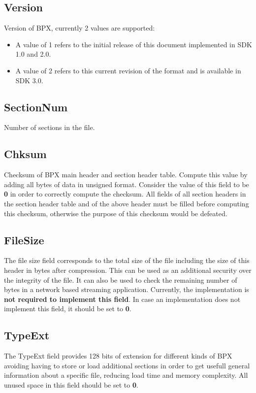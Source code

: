 \subsection{Version}
Version of BPX, currently 2 values are supported:
\begin{itemize}
	\item A value of 1 refers to the initial release of this document implemented in SDK 1.0 and 2.0.
	\item A value of 2 refers to this current revision of the format and is available in SDK 3.0.
\end{itemize}

\subsection{SectionNum}
Number of sections in the file.

\subsection{Chksum}
Checksum of BPX main header and section header table. Compute this value by adding all bytes of data in unsigned format. Consider the value of this field to be \textbf{0} in order to correctly compute the checksum.\newline
All fields of all section headers in the section header table and of the above header must be filled before computing this checksum, otherwise the purpose of this checksum would be defeated.

\subsection{FileSize}
The file size field corresponds to the total size of the file including the size of this header in bytes after compression.\newline
This can be used as an additional security over the integrity of the file. It can also be used to check the remaining number of bytes in a network based streaming application.\newline
Currently, the implementation is \textbf{not required to implement this field}. In case an implementation does not implement this field, it should be set to \textbf{0}.

\subsection{TypeExt}
The TypeExt field provides 128 bits of extension for different kinds of BPX avoiding having to store or load additional sections in order to get usefull general information about a specific file, reducing load time and memory complexity.\newline
All unused space in this field should be set to \textbf{0}.
